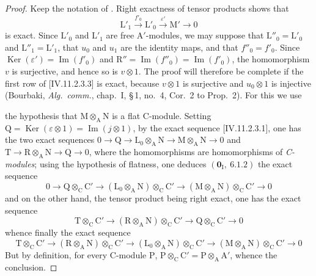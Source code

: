 \begin{proof}
Keep the notation of . Right exactness of tensor
products shows that
\[
  \mathrm{L}'_1\xrightarrow{f'_0}\mathrm{L}'_0
  \xrightarrow{\varepsilon'}\mathrm{M}'\longrightarrow0
\]
is exact. Since $\mathrm{L}'_0$ and $\mathrm{L}'_1$ are free
$\mathrm{A}'$-modules, we may suppose that
$\mathrm{L}''_0=\mathrm{L}'_0$ and
$\mathrm{L}''_1=\mathrm{L}'_1$, that $u_0$ and $u_1$ are the identity
maps, and that $f''_0=f'_0$. Since
$\operatorname{Ker}(\varepsilon')=\operatorname{Im}(f'_0)$ and
$\mathrm{R}''=\operatorname{Im}(f''_0)=\operatorname{Im}(f'_0)$, the
homomorphism $v$ is surjective, and hence so is $v\otimes1$. The proof
will therefore be complete if the first row of
[IV.11.2.3.3] is exact, because $v\otimes1$ is
surjective and $u_0\otimes1$ is injective (Bourbaki,
\emph{Alg.\ comm.}, chap.~I, \S\,1, no.~4, Cor.~2 to Prop.~2). For this
we use


the hypothesis that $\mathrm{M}\otimes_\mathrm{A}\mathrm{N}$ is a flat C-module. Setting $\mathrm{Q}=\operatorname{Ker}(\varepsilon\otimes 1)=\operatorname{Im}(j\otimes 1)$, by the exact sequence [IV.11.2.3.1], one has the two exact sequences $0\to\mathrm{Q}\to\mathrm{L}_0\otimes_\mathrm{A}\mathrm{N}\to\mathrm{M}\otimes_\mathrm{A}\mathrm{N}\to 0$ and $\mathrm{T}\to\mathrm{R}\otimes_\mathrm{A}\mathrm{N}\to\mathrm{Q}\to 0$, where the homomorphisms are homomorphisms of \emph{C-modules}; using the hypothesis of flatness, one deduces $(\mathbf{0}_\mathrm{I},~6.1.2)$ the exact sequence
\[
  0\to\mathrm{Q}\otimes_\mathrm{C}\mathrm{C}'\to(\mathrm{L}_0\otimes_\mathrm{A}\mathrm{N})\otimes_\mathrm{C}\mathrm{C}'\to(\mathrm{M}\otimes_\mathrm{A}\mathrm{N})\otimes_\mathrm{C}\mathrm{C}'\to 0
\]
and on the other hand, the tensor product being right exact, one has the exact sequence
\[
  \mathrm{T}\otimes_\mathrm{C}\mathrm{C}'\to(\mathrm{R}\otimes_\mathrm{A}\mathrm{N})\otimes_\mathrm{C}\mathrm{C}'\to\mathrm{Q}\otimes_\mathrm{C}\mathrm{C}'\to 0
\]
whence finally the exact sequence
\[
  \mathrm{T}\otimes_\mathrm{C}\mathrm{C}'\to(\mathrm{R}\otimes_\mathrm{A}\mathrm{N})\otimes_\mathrm{C}\mathrm{C}'\to(\mathrm{L}_0\otimes_\mathrm{A}\mathrm{N})\otimes_\mathrm{C}\mathrm{C}'\to(\mathrm{M}\otimes_\mathrm{A}\mathrm{N})\otimes_\mathrm{C}\mathrm{C}'\to 0
\]
But by definition, for every C-module $\mathrm{P}$, $\mathrm{P}\otimes_\mathrm{C}\mathrm{C}'=\mathrm{P}\otimes_\mathrm{A}\mathrm{A}'$, whence the conclusion.
\end{proof}

